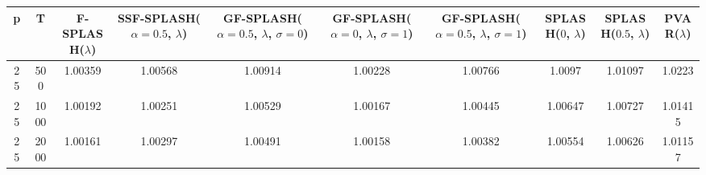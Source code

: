 \begin{tabular}{cccccccccc}
\hline
  p  &  T   &  F-SPLASH($\lambda$)  &  SSF-SPLASH($\alpha=0.5$, $\lambda$)  &  GF-SPLASH($\alpha=0.5$, $\lambda$, $\sigma=0$)  &  GF-SPLASH($\alpha=0$, $\lambda$, $\sigma=1$)  &  GF-SPLASH($\alpha=0.5$, $\lambda$, $\sigma=1$)  &  SPLASH($0$, $\lambda$)  &  SPLASH($0.5$, $\lambda$)  &  PVAR($\lambda$)  \\
\hline
 25  & 500  &        1.00359        &                1.00568                &                     1.00914                      &                    1.00228                     &                     1.00766                      &          1.0097          &          1.01097           &      1.0223       \\
 25  & 1000 &        1.00192        &                1.00251                &                     1.00529                      &                    1.00167                     &                     1.00445                      &         1.00647          &          1.00727           &      1.01415      \\
 25  & 2000 &        1.00161        &                1.00297                &                     1.00491                      &                    1.00158                     &                     1.00382                      &         1.00554          &          1.00626           &      1.01157      \\
\hline
\end{tabular}